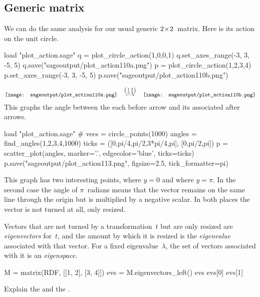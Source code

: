 \subsection{Generic matrix}
We can do the same analysis for our usual generic $2 \! \times \! 2$~matrix.
Here is its action on the unit circle.
\begin{sageoutput}[d,0,4;d,5,7]
load "plot_action.sage"
q = plot_circle_action(1,0,0,1) 
q.set_axes_range(-3, 3, -5, 5) 
q.save("sageoutput/plot_action110a.png")
p = plot_circle_action(1,2,3,4) 
p.set_axes_range(-3, 3, -5, 5) 
p.save("sageoutput/plot_action110b.png")
\end{sageoutput}
\begin{equation*}
  \vcenteredhbox{\texttt{[image: sageoutput/plot\_action110a.png]}}
  \quad\mapsunder{\big (\begin{smallmatrix} 1 &2 \\ 3 &4 \end{smallmatrix}\big )}\quad
  \vcenteredhbox{\texttt{[image: sageoutput/plot\_action110b.png]}}
\end{equation*}
This graphs the angle between the each before arrow and its associated after
arrows.
\begin{sageoutput}[d,0,1]
load "plot_action.sage"  
# vecs = circle_points(1000)
angles = find_angles(1,2,3,4,1000)
ticks = ([0,pi/4,pi/2,3*pi/4,pi], [0,pi/2,pi])
p = scatter_plot(angles, marker='.', edgecolor='blue', ticks=ticks)
p.save("sageoutput/plot_action113.png", figsize=2.5, tick_formatter=pi)
\end{sageoutput}
\begin{center}
\end{center}
This graph has two interesting points, where $y=0$ and where 
$y=\pi$.
In the second case
the angle of $\pi$~radians means that the vector remains on the
same line through the origin but is multiplied by a negative scalar.
In both places the vector is not turned at all, only resized.

Vectors that are not turned by a transformation~$t$ but are only resized 
are \textit{eigenvectors} for~$t$, and the amount by which it is 
resized is the \textit{eigenvalue} associated with that vector.
For a fixed eigenvalue~$\lambda$, the set of vectors associated with
it is an \textit{eigenspace}.
\begin{sageoutput}[s,3,59,13]
M = matrix(RDF, [[1, 2], [3, 4]])
evs = M.eigenvectors_left()
evs
evs[0] 
evs[1]
\end{sageoutput}
Explain the  and the .


